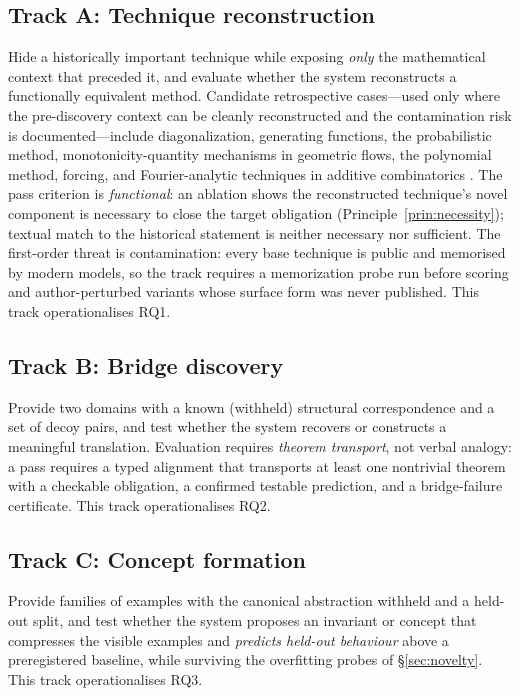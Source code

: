\documentclass[11pt]{article}
\theoremstyle{definition}
\theoremstyle{remark}
\begin{document}
\subsection{Track A: Technique reconstruction}
Hide a historically important technique while exposing \emph{only} the mathematical context that
preceded it, and evaluate whether the system reconstructs a functionally equivalent method.
Candidate retrospective cases---used only where the pre-discovery context can be cleanly
reconstructed and the contamination risk is documented---include diagonalization, generating
functions, the probabilistic method, monotonicity-quantity mechanisms in geometric flows, the
polynomial method, forcing, and Fourier-analytic techniques in additive combinatorics
\citep{cohen1963,greentao2008,guthkatz2015,hamilton1982,perelman2002}. The pass criterion is
\emph{functional}: an ablation shows the reconstructed technique's novel component is necessary to
close the target obligation (Principle~\ref{prin:necessity}); textual match to the historical
statement is neither necessary nor sufficient. The first-order threat is contamination: every base
technique is public and memorised by modern models, so the track requires a memorization probe run
before scoring and author-perturbed variants whose surface form was never published. This track
operationalises RQ1.

\subsection{Track B: Bridge discovery}
Provide two domains with a known (withheld) structural correspondence and a set of decoy pairs, and
test whether the system recovers or constructs a meaningful translation. Evaluation requires
\emph{theorem transport}, not verbal analogy: a pass requires a typed alignment that transports at
least one nontrivial theorem with a checkable obligation, a confirmed testable prediction, and a
bridge-failure certificate. This track operationalises RQ2.

\subsection{Track C: Concept formation}
Provide families of examples with the canonical abstraction withheld and a held-out split, and test
whether the system proposes an invariant or concept that compresses the visible examples and
\emph{predicts held-out behaviour} above a preregistered baseline, while surviving the overfitting
probes of \S\ref{sec:novelty}. This track operationalises RQ3.
\end{document}
